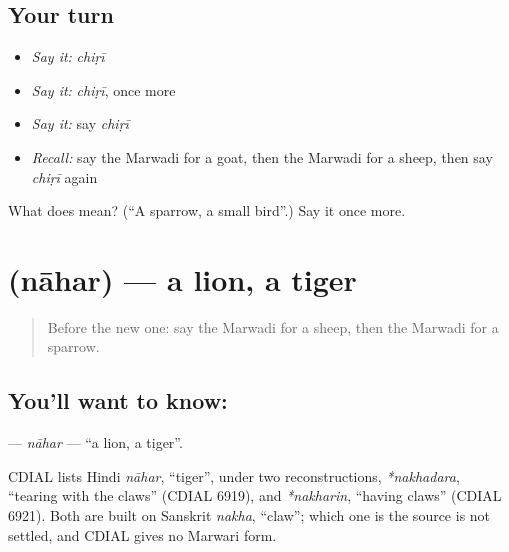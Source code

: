 \subsection*{Your turn}
\begin{itemize}
\raggedright
  \item \emph{Say it:} \emph{chiṛī}
  \item \emph{Say it:} \emph{chiṛī}, once more
  \item \emph{Say it:} say \emph{chiṛī}
  \item \emph{Recall:} say the Marwadi for a goat, then the Marwadi for a sheep, then say \emph{chiṛī} again
\end{itemize}

\begin{tcolorbox}[breakable,colback=teal!4,colframe=teal!35!black,title={Before you move on}]
What does  mean? (\textquotedblleft{}A sparrow, a small bird\textquotedblright{}.) Say it once more.
\end{tcolorbox}
\section[\texorpdfstring{\mw{नाहर} (nāhar)}{नाहर (nāhar)}]{ (nāhar) — a lion, a tiger}

\label{lesson:MW-C71-nahar}



\begin{quote}
Before the new one: say the Marwadi for a sheep, then the Marwadi for a sparrow.
\end{quote}

\subsection*{You'll want to know: }
\textbf{} — \emph{nāhar} — \textquotedblleft{}a lion, a tiger\textquotedblright{}.

\begin{cousinweb}
CDIAL lists Hindi \emph{nāhar}, \textquotedblleft{}tiger\textquotedblright{}, under two reconstructions, \emph{*nakhadara}, \textquotedblleft{}tearing with the claws\textquotedblright{} (CDIAL 6919), and \emph{*nakharin}, \textquotedblleft{}having claws\textquotedblright{} (CDIAL 6921). Both are built on Sanskrit \emph{nakha}, \textquotedblleft{}claw\textquotedblright{}; which one is the source is not settled, and CDIAL gives no Marwari form.
\end{cousinweb}

